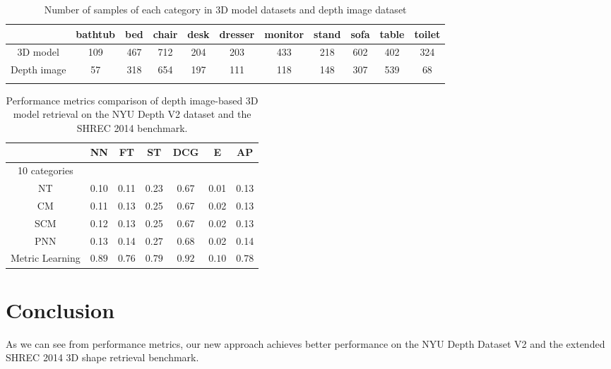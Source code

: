 \documentclass{article}
\begin{document}
\begin{table}
	
	\footnotesize
	\centering
	\caption{Number of samples of each category in 3D model datasets and depth image dataset}
	\label{table1}
	\begin{tabular}{ccccccccccc}
		\hline
		\hline
		\noalign{\smallskip}
		 &bathtub &bed & chair & desk & dresser & monitor &stand &sofa &table &toilet\\ \hline\noalign{\smallskip}	
		3D model &109 &467 &712 &204 &203 &433 &218 &602 &402 &324\\
		Depth image &57  &318 &654 &197 &111 &118 &148 &307 &539 &68 \\		
		\hline\noalign{\smallskip}	
		\hline
	\end{tabular}
\end{table}

\begin{table}
	
	\footnotesize
	\centering
	\caption{Performance metrics comparison of depth image-based 3D model retrieval on the NYU Depth V2 dataset and the SHREC 2014 benchmark.}
	\label{table2}
	\begin{tabular}{ccccccc}
		\hline
		\hline
		\noalign{\smallskip}
		&NN & FT & ST & DCG & E & AP\\ \hline\noalign{\smallskip}		
		10 categories\\ 
		NT  &0.10 &0.11 &0.23 & 0.67 & 0.01 & 0.13 \\ 
		CM  &0.11 &0.13 &0.25 & 0.67 & 0.02 & 0.13 \\ 
		SCM &0.12 &0.13 &0.25 & 0.67 & 0.02 & 0.13 \\ 
		PNN &0.13 &0.14 &0.27 & 0.68 & 0.02 & 0.14 \\		
		Metric Learning &$\bm{0.89}$ &$\bm{0.76}$ &$\bm{0.79}$ &$\bm{0.92}$ &$\bm{0.10}$ &$\bm{0.78}$\\\hline
		\hline
	\end{tabular}
\end{table}

\section{Conclusion}
As we can see from performance metrics, our new approach achieves better performance on the NYU Depth Dataset V2 and the extended SHREC 2014 3D shape retrieval benchmark.\\
 

\end{document}
